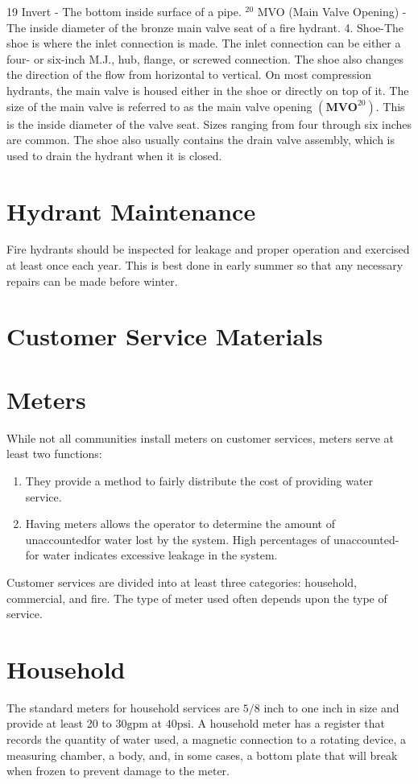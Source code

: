 \documentclass[10pt]{article}
\begin{document}
19 Invert - The bottom inside surface of a pipe. ${ }^{20}$ MVO (Main Valve Opening) - The inside diameter of the bronze main valve seat of a fire hydrant. 4. Shoe-The shoe is where the inlet connection is made. The inlet connection can be either a four- or six-inch M.J., hub, flange, or screwed connection. The shoe also changes the direction of the flow from horizontal to vertical. On most compression hydrants, the main valve is housed either in the shoe or directly on top of it. The size of the main valve is referred to as the main valve opening $\left(\mathbf{M V O}^{20}\right)$. This is the inside diameter of the valve seat. Sizes ranging from four through six inches are common. The shoe also usually contains the drain valve assembly, which is used to drain the hydrant when it is closed.

\section{Hydrant Maintenance}
Fire hydrants should be inspected for leakage and proper operation and exercised at least once each year. This is best done in early summer so that any necessary repairs can be made before winter.

\section{Customer Service Materials}
\section{Meters}
While not all communities install meters on customer services, meters serve at least two functions:

\begin{enumerate}
  \item They provide a method to fairly distribute the cost of providing water service.

  \item Having meters allows the operator to determine the amount of unaccountedfor water lost by the system. High percentages of unaccounted-for water indicates excessive leakage in the system.

\end{enumerate}
Customer services are divided into at least three categories: household, commercial, and fire. The type of meter used often depends upon the type of service.

\section{Household}
The standard meters for household services are $5 / 8$ inch to one inch in size and provide at least 20 to $30 \mathrm{gpm}$ at $40 \mathrm{psi}$. A household meter has a register that records the quantity of water used, a magnetic connection to a rotating device, a measuring chamber, a body, and, in some cases, a bottom plate that will break when frozen to prevent damage to the meter.
\end{document}
